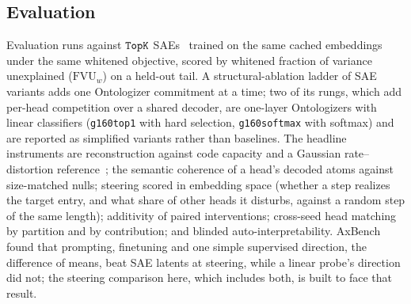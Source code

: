 \subsection{Evaluation}
\label{sec:eval}
Evaluation runs against $\mathop{\mathtt{TopK}}\limits$ SAEs~\cite{gao2024} trained on the same
cached embeddings under the same whitened objective, scored by whitened
fraction of variance unexplained ($\mathrm{FVU}_w$) on a held-out tail.
A structural-ablation ladder of SAE variants adds one Ontologizer
commitment at a time; two of its rungs, which add per-head competition
over a shared decoder, are one-layer Ontologizers with linear
classifiers (\texttt{g160top1} with hard selection, \texttt{g160softmax}
with softmax) and are reported as simplified variants rather than
baselines. The headline instruments are reconstruction against code
capacity and a Gaussian rate--distortion reference~\cite{cover2006}; the
semantic coherence of a
head's decoded atoms against size-matched nulls; steering scored in
embedding space (whether a step realizes the target entry, and what
share of other heads it disturbs, against a random step of the same
length); additivity of paired interventions; cross-seed head matching
by partition and by contribution; and blinded auto-interpretability.
AxBench~\cite{wu2025axbenchsteeringllmssimple} found that prompting,
finetuning and one simple supervised direction, the difference of means,
beat SAE latents at steering, while a linear probe's direction did not;
the steering comparison here, which includes both, is built to face that
result.
